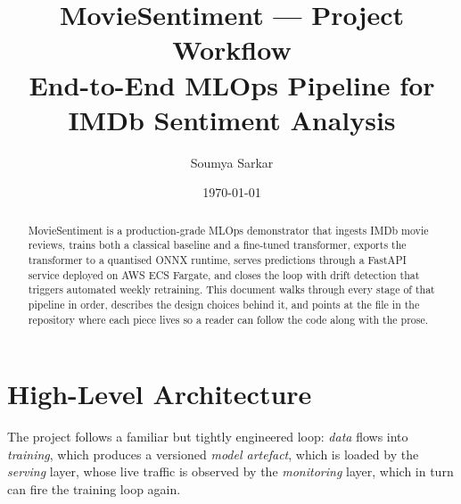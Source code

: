 \documentclass[11pt,a4paper]{article}
\title{\textbf{MovieSentiment --- Project Workflow}\\[2pt]
       \large End-to-End MLOps Pipeline for IMDb Sentiment Analysis}
\author{Soumya Sarkar}
\date{\today}
\begin{document}
\maketitle

\begin{abstract}
\noindent MovieSentiment is a production-grade MLOps demonstrator that ingests IMDb
movie reviews, trains both a classical baseline and a fine-tuned transformer, exports
the transformer to a quantised ONNX runtime, serves predictions through a FastAPI
service deployed on AWS ECS Fargate, and closes the loop with drift detection that
triggers automated weekly retraining. This document walks through every stage of that
pipeline in order, describes the design choices behind it, and points at the file in
the repository where each piece lives so a reader can follow the code along with the
prose.
\end{abstract}

\tableofcontents
\newpage

\section{High-Level Architecture}

The project follows a familiar but tightly engineered loop: \emph{data} flows into
\emph{training}, which produces a versioned \emph{model artefact}, which is loaded by
the \emph{serving} layer, whose live traffic is observed by the \emph{monitoring}
layer, which in turn can fire the training loop again.
\end{document}

